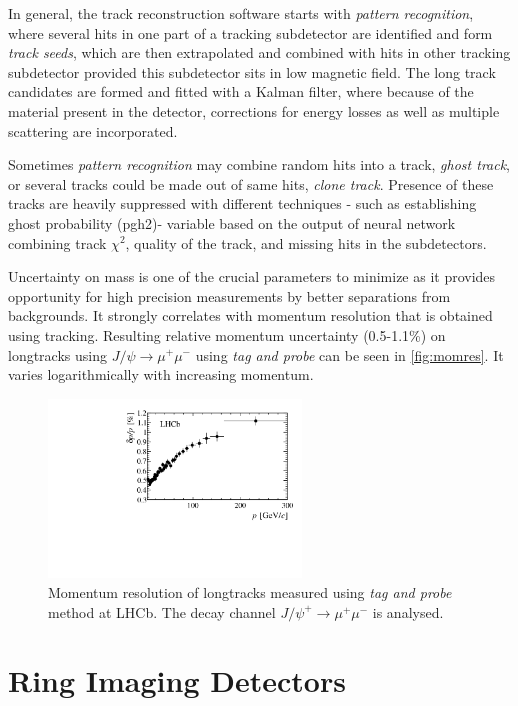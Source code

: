 In general, the track reconstruction software starts with \textit{pattern recognition}, where several hits in one part of a tracking subdetector are identified and form \textit{track seeds}, which are then extrapolated and combined with hits in other tracking subdetector provided this subdetector sits in low magnetic field. The long track candidates are formed and fitted with a Kalman filter\cite{Hierk:684697}, where because of the material present in the detector, corrections for energy losses as well as multiple scattering are incorporated.

Sometimes \textit{pattern recognition} may combine random hits into a track, \textit{ghost track}, or several tracks could be made out of same hits, \textit{clone track}. Presence of these tracks are heavily suppressed with different techniques - such as establishing ghost probability (\Gls{pgh2})- variable based on the output of neural network combining track $\chi^{2}$, quality of the track, and missing hits in the subdetectors.

Uncertainty on mass is one of the crucial parameters to minimize as it provides opportunity for high precision measurements by better separations from backgrounds. It strongly correlates with momentum resolution that is obtained using tracking. Resulting relative momentum uncertainty (0.5-1.1\%) on \gls{longtrack}s using $J/\psi \rightarrow \mu^{+} \mu^{-}$ using \textit{tag and probe} can be seen in \autoref{fig:momres}. It varies logarithmically with increasing momentum.


\begin{figure}[!h]
	\centering
	\includegraphics[width = 0.6\textwidth]{figs/detector/momresolution.png}
	\caption{Momentum resolution of \gls{longtrack}s measured using \textit{tag and probe} method at \gls{LHCb}. The decay channel $J/\psi^{+} \rightarrow \mu^{+} \mu^{-}$ is analysed.}
	\label{fig:momres}
\end{figure}

\section{Ring Imaging Detectors }


